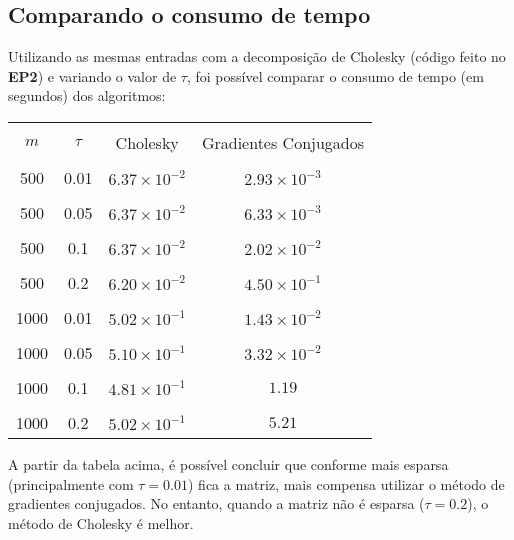 \documentclass[a4paper,11pt]{article}
\begin{document}
        \subsection{Comparando o consumo de tempo}    
            Utilizando as mesmas entradas com a decomposição de Cholesky (código feito no \textbf{EP2}) e variando o valor de $\tau$, foi possível comparar o consumo de tempo (em segundos) dos algoritmos:
            \begin{center}
                \begin{tabular}{ | c | c | c | c | } 
                    \hline
                    & & \\ [-1em]
                    $m$ & $\tau$ & Cholesky & Gradientes Conjugados\\  [+.5em]
                    \hline\hline
                    & & & \\ [-1em]
                    500 & 0.01 & $ 6.37\times 10^{-2}$ & $ 2.93 \times 10^{-3}$ \\ [+.5em]
                    \hline
                    & & & \\ [-1em]
                    500 & 0.05 & $ 6.37 \times 10^{-2}$ & $ 6.33 \times 10^{-3}$ \\ [+.5em]
                    \hline
                    & & & \\ [-1em]
                    500 & 0.1 & $ 6.37 \times 10^{-2}$ & $ 2.02 \times 10^{-2}$ \\ [+.5em]
                    \hline
                    & & & \\ [-1em]
                    500 & 0.2 & $ 6.20 \times 10^{-2}$ & $ 4.50 \times 10^{-1}$ \\ [+.5em]
                    \hline\hline
                    & & & \\ [-1em]
                    1000 & 0.01 & $ 5.02 \times 10^{-1}$ & $ 1.43 \times 10^{-2}$ \\ [+.5em]
                    \hline
                    & & & \\ [-1em]
                    1000 & 0.05 & $ 5.10 \times 10^{-1}$ & $ 3.32 \times 10^{-2}$ \\ [+.5em]
                    \hline
                    & & & \\ [-1em]
                    1000 & 0.1 & $ 4.81 \times 10^{-1}$ & $ 1.19 $ \\ [+.5em]
                    \hline
                    & & & \\ [-1em]
                    1000 & 0.2 & $ 5.02 \times 10^{-1}$ & $ 5.21 $ \\ [+.5em]
                    \hline
                \end{tabular}
            \end{center}
            A partir da tabela acima, é possível concluir que conforme mais esparsa (principalmente com $\tau = 0.01$) fica a matriz, mais compensa utilizar o método de gradientes conjugados. No entanto, quando a matriz não é esparsa ($\tau = 0.2$), o método de Cholesky é melhor. 
\end{document}
